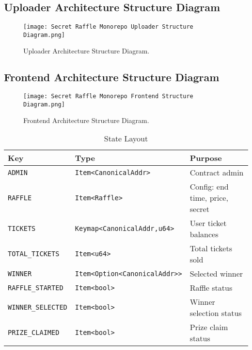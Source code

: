 \documentclass{article}
\begin{document}
\subsection{Uploader Architecture Structure Diagram}
\begin{figure}[h]
  \vspace{0cm}
  \hspace{-3cm}
  \texttt{[image: Secret Raffle Monorepo Uploader Structure Diagram.png]}
  \caption{Uploader Architecture Structure Diagram.}
  \label{fig:Uploader Architecture Structure Diagram Appendix}
\end{figure}

\newpage

\subsection{Frontend Architecture Structure Diagram}
\begin{figure}[h]
  \vspace{0cm}
  \hspace{-3cm}
  \texttt{[image: Secret Raffle Monorepo Frontend Structure Diagram.png]}
  \caption{Frontend Architecture Structure Diagram.}
  \label{fig:Frontend Architecture Structure Diagram Appendix}
\end{figure}

\begin{table}[h]
  \centering
  \caption{State Layout}
  \begin{tabular}{@{}lll@{}}
    \toprule
    \textbf{Key} & \textbf{Type} & \textbf{Purpose} \\
    \midrule
    \texttt{ADMIN} & \texttt{Item<CanonicalAddr>} & Contract admin \\
    \texttt{RAFFLE} & \texttt{Item<Raffle>} & Config: end time, price, secret \\
    \texttt{TICKETS} & \texttt{Keymap<CanonicalAddr,u64>} & User ticket balances \\
    \texttt{TOTAL\_TICKETS} & \texttt{Item<u64>} & Total tickets sold \\
    \texttt{WINNER} & \texttt{Item<Option<CanonicalAddr>>} & Selected winner \\
    \texttt{RAFFLE\_STARTED} & \texttt{Item<bool>} & Raffle status \\
    \texttt{WINNER\_SELECTED} & \texttt{Item<bool>} & Winner selection status \\
    \texttt{PRIZE\_CLAIMED} & \texttt{Item<bool>} & Prize claim status \\
    \bottomrule
  \end{tabular}
\end{table}
\end{document}
